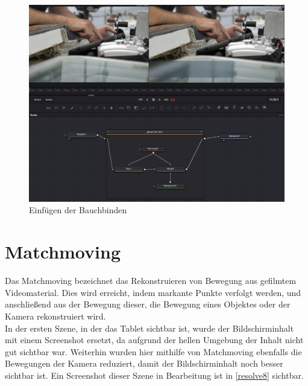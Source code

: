 \begin{figure}[H]
\begin{center}
\includegraphics[width=\textwidth]{gfx/post/resolve3.jpg}
\caption{Einfügen der Bauchbinden}
\label{resolve3}
\end{center}
\end{figure}

\section{Matchmoving}



Das Matchmoving bezeichnet das Rekonstruieren von Bewegung aus gefilmtem Videomaterial. Dies wird erreicht, indem markante Punkte verfolgt werden, und anschließend aus der Bewegung dieser, die Bewegung eines Objektes oder der Kamera rekonstruiert wird. \\
In der ersten Szene, in der das Tablet sichtbar ist, wurde der Bildschirminhalt mit einem Screenshot ersetzt, da aufgrund der hellen Umgebung der Inhalt nicht gut sichtbar war. Weiterhin wurden hier mithilfe von Matchmoving ebenfalls die Bewegungen der Kamera reduziert, damit der Bildschirminhalt noch besser sichtbar ist. Ein Screenshot dieser Szene in Bearbeitung ist in \autoref{resolve8} sichtbar.\\

